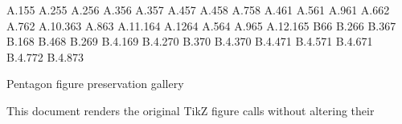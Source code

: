 \documentclass{amsart}
\def\tikzfig#1#2#3{%
\begin{figure}[htb]%
  \centering
\begin{tikzpicture}#3
\end{tikzpicture}
  \caption{#2}
  \label{fig:#1}%
\end{figure}%
}
\numberwithin{equation}{section}
\numberwithin{figure}{section}
\numberwithin{table}{section}
\theoremstyle{plain}
\theoremstyle{definition}
\theoremstyle{remark}
\begin{document}
\expandafter\def\csname r@fig:theta\endcsname{{A.1}{55}}
\expandafter\def\csname r@sec:xalpha\endcsname{{A.2}{55}}
\expandafter\def\csname r@fig:extended\endcsname{{A.2}{56}}
\expandafter\def\csname r@sec:banana\endcsname{{A.3}{56}}
\expandafter\def\csname r@fig:banana2\endcsname{{A.3}{57}}
\expandafter\def\csname r@sec:pet\endcsname{{A.4}{57}}
\expandafter\def\csname r@fig:p-triangle\endcsname{{A.4}{58}}
\expandafter\def\csname r@sec:shared\endcsname{{A.7}{58}}
\expandafter\def\csname r@eqn:abc\endcsname{{A.4}{61}}
\expandafter\def\csname r@fig:cord-delta\endcsname{{A.5}{61}}
\expandafter\def\csname r@sec:pinwheel\endcsname{{A.9}{61}}
\expandafter\def\csname r@fig:cord-pinwheel\endcsname{{A.6}{62}}
\expandafter\def\csname r@fig:cord-L\endcsname{{A.7}{62}}
\expandafter\def\csname r@sec:one-ljx\endcsname{{A.10.3}{63}}
\expandafter\def\csname r@fig:cord-T\endcsname{{A.8}{63}}
\expandafter\def\csname r@sec:one-tjx\endcsname{{A.11.1}{64}}
\expandafter\def\csname r@sec:pint\endcsname{{A.12}{64}}
\expandafter\def\csname r@lemma:0605\endcsname{{A.5}{64}}
\expandafter\def\csname r@fig:cord-pint\endcsname{{A.9}{65}}
\expandafter\def\csname r@sec:one-pintx\endcsname{{A.12.1}{65}}
\expandafter\def\csname r@appendix:cc\endcsname{{B}{66}}
\expandafter\def\csname r@sec:auto-diff\endcsname{{B.2}{66}}
\expandafter\def\csname r@sec:mitm\endcsname{{B.3}{67}}
\expandafter\def\csname r@eqn:assembly\endcsname{{B.1}{68}}
\expandafter\def\csname r@sec:calc-prep\endcsname{{B.4}{68}}
\expandafter\def\csname r@lemma:peripheral-o2c\endcsname{{B.2}{69}}
\expandafter\def\csname r@sec:pseudo1\endcsname{{B.4.1}{69}}
\expandafter\def\csname r@sec:pseudo2\endcsname{{B.4.2}{70}}
\expandafter\def\csname r@eqn:pseudo2-constraint\endcsname{{B.3}{70}}
\expandafter\def\csname r@sec:pseudo-area\endcsname{{B.4.3}{70}}
\expandafter\def\csname r@sec:pseudo-area3\endcsname{{B.4.4}{71}}
\expandafter\def\csname r@sec:dimer-isosc\endcsname{{B.4.5}{71}}
\expandafter\def\csname r@sec:large\endcsname{{B.4.6}{71}}
\expandafter\def\csname r@sec:pent3\endcsname{{B.4.7}{72}}
\expandafter\def\csname r@sec:pent4\endcsname{{B.4.8}{73}}
\makeatother
\renewcommand{\thefigure}{\currentfigurenumber}
\def\tikzfig#1#2#3{\begin{figure}[p]\centering\begin{tikzpicture}#3\end{tikzpicture}\caption{#2}\end{figure}}
\begin{center}\Large Pentagon figure preservation gallery\end{center}
This document renders the original TikZ figure calls without altering their
\end{document}
